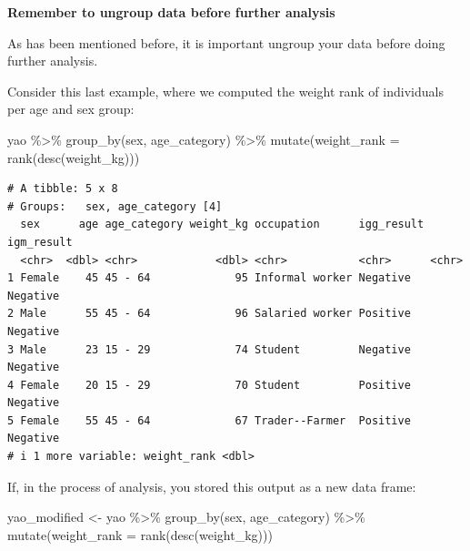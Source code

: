 \documentclass[
  letterpaper,
  DIV=11,
  numbers=noendperiod]{scrreprt}
\newenvironment{Shaded}{\begin{snugshade}}{\end{snugshade}}
\newcommand{\AttributeTok}[1]{\textcolor[rgb]{0.40,0.45,0.13}{#1}}
\newcommand{\FunctionTok}[1]{\textcolor[rgb]{0.28,0.35,0.67}{#1}}
\newcommand{\NormalTok}[1]{\textcolor[rgb]{0.00,0.23,0.31}{#1}}
\newcommand{\OtherTok}[1]{\textcolor[rgb]{0.00,0.23,0.31}{#1}}
\newcommand{\SpecialCharTok}[1]{\textcolor[rgb]{0.37,0.37,0.37}{#1}}
\begin{document}
\begin{tcolorbox}[enhanced jigsaw, titlerule=0mm, colback=white, left=2mm, breakable, opacitybacktitle=0.6, colbacktitle=quarto-callout-caution-color!10!white, colframe=quarto-callout-caution-color-frame, bottomtitle=1mm, opacityback=0, coltitle=black, arc=.35mm, toptitle=1mm, title=\textcolor{quarto-callout-caution-color}{\faFire}\hspace{0.5em}{Watch Out}, leftrule=.75mm, toprule=.15mm, bottomrule=.15mm, rightrule=.15mm]

\textbf{Remember to ungroup data before further analysis}

As has been mentioned before, it is important ungroup your data before
doing further analysis.

Consider this last example, where we computed the weight rank of
individuals per age and sex group:

\begin{Shaded}
\begin{Highlighting}[]
\NormalTok{yao }\SpecialCharTok{\%\textgreater{}\%} 
  \FunctionTok{group\_by}\NormalTok{(sex, age\_category) }\SpecialCharTok{\%\textgreater{}\%} 
  \FunctionTok{mutate}\NormalTok{(}\AttributeTok{weight\_rank =} \FunctionTok{rank}\NormalTok{(}\FunctionTok{desc}\NormalTok{(weight\_kg)))}
\end{Highlighting}
\end{Shaded}

\begin{verbatim}
# A tibble: 5 x 8
# Groups:   sex, age_category [4]
  sex      age age_category weight_kg occupation      igg_result igm_result
  <chr>  <dbl> <chr>            <dbl> <chr>           <chr>      <chr>     
1 Female    45 45 - 64             95 Informal worker Negative   Negative  
2 Male      55 45 - 64             96 Salaried worker Positive   Negative  
3 Male      23 15 - 29             74 Student         Negative   Negative  
4 Female    20 15 - 29             70 Student         Positive   Negative  
5 Female    55 45 - 64             67 Trader--Farmer  Positive   Negative  
# i 1 more variable: weight_rank <dbl>
\end{verbatim}

If, in the process of analysis, you stored this output as a new data
frame:

\begin{Shaded}
\begin{Highlighting}[]
\NormalTok{yao\_modified }\OtherTok{\textless{}{-}} 
\NormalTok{  yao }\SpecialCharTok{\%\textgreater{}\%} 
  \FunctionTok{group\_by}\NormalTok{(sex, age\_category) }\SpecialCharTok{\%\textgreater{}\%} 
  \FunctionTok{mutate}\NormalTok{(}\AttributeTok{weight\_rank =} \FunctionTok{rank}\NormalTok{(}\FunctionTok{desc}\NormalTok{(weight\_kg)))}
\end{Highlighting}
\end{Shaded}


\end{tcolorbox}
\end{document}
